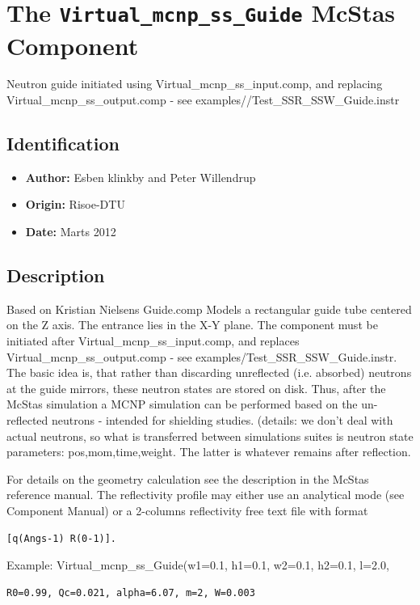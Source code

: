 \section{The \texttt{Virtual\_mcnp\_ss\_Guide} McStas Component}
Neutron guide initiated using Virtual\_mcnp\_ss\_input.comp, and replacing Virtual\_mcnp\_ss\_output.comp  - see examples//Test\_SSR\_SSW\_Guide.instr

\subsection*{Identification}
\begin{itemize}
  \item \textbf{Author:} Esben klinkby and Peter Willendrup
  \item \textbf{Origin:} Risoe-DTU
  \item \textbf{Date:} Marts 2012
\end{itemize}

\subsection*{Description}
Based on Kristian Nielsens Guide.comp Models a rectangular guide tube centered on the Z axis. The entrance lies in the X-Y plane. The component must be initiated after Virtual\_mcnp\_ss\_input.comp, and replaces Virtual\_mcnp\_ss\_output.comp - see examples/Test\_SSR\_SSW\_Guide.instr. The basic idea is, that rather than discarding unreflected (i.e. absorbed) neutrons at the guide mirrors, these neutron states are stored on disk. Thus, after the McStas simulation a MCNP simulation can be performed based on the un-reflected neutrons - intended for shielding studies. (details: we don't deal with actual neutrons, so what is transferred between simulations suites is neutron state parameters: pos,mom,time,weight. The latter is whatever remains after reflection.

For details on the geometry calculation see the description in the McStas reference manual. The reflectivity profile may either use an analytical mode (see Component Manual) or a 2-columns reflectivity free text file with format

\begin{verbatim}
[q(Angs-1) R(0-1)].
\end{verbatim}

Example: Virtual\_mcnp\_ss\_Guide(w1=0.1, h1=0.1, w2=0.1, h2=0.1, l=2.0,

\begin{verbatim}
R0=0.99, Qc=0.021, alpha=6.07, m=2, W=0.003
\end{verbatim}

